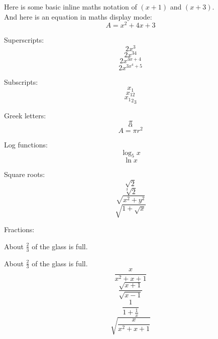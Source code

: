 \documentclass[11pt]{article}
\begin{document}
Here is some basic inline maths notation of $(x+1)$ and $(x+3)$.\\
And here is an equation in maths display mode: $$A=x^2+4x+3$$

Superscripts:
$$2x^3$$
$$2x^{34}$$
$$2x^{3x+4}$$
$$2x^{3x^4+5}$$

Subscripts:
$$x_1$$
$$x_{12}$$
$${{x_1}_2}_3$$

Greek letters:
$$\pi$$
$$\alpha$$
$$A=\pi r^2$$

Log functions:
$$\log_5{x}$$
$$\ln{x}$$

Square roots:
$$\sqrt{2}$$
$$\sqrt[3]{2}$$
$$\sqrt{x^2+y^2}$$
$$\sqrt{1+\sqrt{x}}$$

Fractions:

About $\frac{2}{3}$ of the glass is full.

About $\displaystyle{\frac{2}{3}}$ of the glass is full.
$$\frac{x}{x^2+x+1}$$
$$\frac{\sqrt{x+1}}{\sqrt{x-1}}$$
$$\frac{1}{1+\frac{1}{x}}$$
$$\sqrt{\frac{x}{x^2+x+1}}$$
\end{document}
